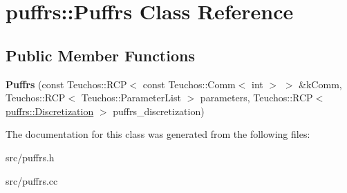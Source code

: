 \hypertarget{classpuffrs_1_1Puffrs}{}\section{puffrs\+:\+:Puffrs Class Reference}
\label{classpuffrs_1_1Puffrs}
\subsection*{Public Member Functions}
\begin{DoxyCompactItemize}
\item 
\mbox{\label{classpuffrs_1_1Puffrs_abcef5a8b8844d979db872e51b8f89abb}} 
{\bfseries Puffrs} (const Teuchos\+::\+R\+CP$<$ const Teuchos\+::\+Comm$<$ int $>$ $>$ \&k\+Comm, Teuchos\+::\+R\+CP$<$ Teuchos\+::\+Parameter\+List $>$ parameters, Teuchos\+::\+R\+CP$<$ \hyperlink{classpuffrs_1_1Discretization}{puffrs\+::\+Discretization} $>$ puffrs\+\_\+discretization)
\end{DoxyCompactItemize}


The documentation for this class was generated from the following files\+:\begin{DoxyCompactItemize}
\item 
src/puffrs.\+h\item 
src/puffrs.\+cc\end{DoxyCompactItemize}
